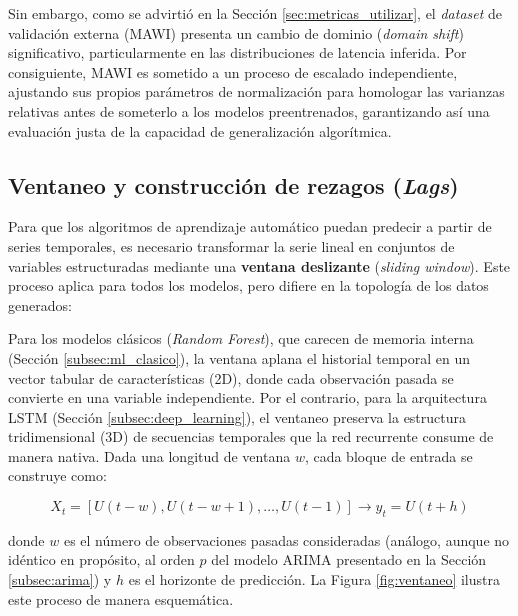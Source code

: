 \documentclass[12pt]{report}
\begin{document}
Sin embargo, como se advirtió en la Sección \ref{sec:metricas_utilizar}, el \textit{dataset} de validación externa (MAWI) presenta un cambio de dominio (\textit{domain shift}) significativo, particularmente en las distribuciones de latencia inferida. Por consiguiente, MAWI es sometido a un proceso de escalado independiente, ajustando sus propios parámetros de normalización para homologar las varianzas relativas antes de someterlo a los modelos preentrenados, garantizando así una evaluación justa de la capacidad de generalización algorítmica.

\subsection*{Ventaneo y construcción de rezagos (\textit{Lags})}

Para que los algoritmos de aprendizaje automático puedan predecir a partir de series temporales, es necesario transformar la serie lineal en conjuntos de variables estructuradas mediante una \textbf{ventana deslizante} (\textit{sliding window}). Este proceso aplica para todos los modelos, pero difiere en la topología de los datos generados:

Para los modelos clásicos (\textit{Random Forest}), que carecen de memoria interna (Sección \ref{subsec:ml_clasico}), la ventana aplana el historial temporal en un vector tabular de características (2D), donde cada observación pasada se convierte en una variable independiente. Por el contrario, para la arquitectura LSTM  (Sección \ref{subsec:deep_learning}), el ventaneo preserva la estructura tridimensional (3D) de secuencias temporales que la red recurrente consume de manera nativa. Dada una longitud de ventana $w$, cada bloque de 
entrada se construye como:

\begin{equation}
    X_t = \left[U(t-w), U(t-w+1), \dots, U(t-1)\right] \longrightarrow y_t = U(t+h)
    \label{eq:ventaneo}
\end{equation}

donde $w$ es el número de observaciones pasadas consideradas (análogo, aunque no idéntico en propósito, al orden $p$ del modelo ARIMA presentado en la Sección \ref{subsec:arima}) y $h$ es el horizonte de predicción. La Figura \ref{fig:ventaneo} ilustra este proceso de manera esquemática.
\end{document}
